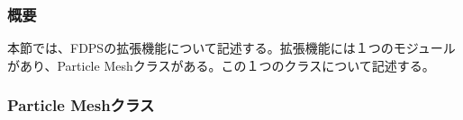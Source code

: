 \subsubsection{概要}

本節では、FDPSの拡張機能について記述する。拡張機能には１つのモジュール
があり、Particle Meshクラスがある。この１つのクラスについて記述する。

\subsubsection{Particle Meshクラス}


